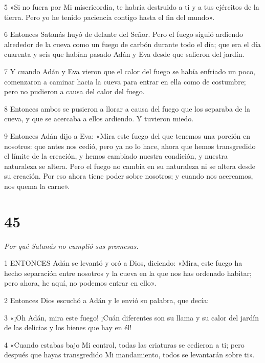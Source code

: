 \par 5 »Si no fuera por Mi misericordia, te habría destruido a ti y a tus ejércitos de la tierra. Pero yo he tenido paciencia contigo hasta el fin del mundo».

\par 6 Entonces Satanás huyó de delante del Señor. Pero el fuego siguió ardiendo alrededor de la cueva como un fuego de carbón durante todo el día; que era el día cuarenta y seis que habían pasado Adán y Eva desde que salieron del jardín.

\par 7 Y cuando Adán y Eva vieron que el calor del fuego se había enfriado un poco, comenzaron a caminar hacia la cueva para entrar en ella como de costumbre; pero no pudieron a causa del calor del fuego.

\par 8 Entonces ambos se pusieron a llorar a causa del fuego que los separaba de la cueva, y que se acercaba a ellos ardiendo. Y tuvieron miedo.

\par 9 Entonces Adán dijo a Eva: «Mira este fuego del que tenemos una porción en nosotros: que antes nos cedió, pero ya no lo hace, ahora que hemos transgredido el límite de la creación, y hemos cambiado nuestra condición, y nuestra naturaleza se altera. Pero el fuego no cambia en su naturaleza ni se altera desde su creación. Por eso ahora tiene poder sobre nosotros; y cuando nos acercamos, nos quema la carne».

\chapter{45}

\par \textit{Por qué Satanás no cumplió sus promesas.}

\par 1 ENTONCES Adán se levantó y oró a Dios, diciendo: «Mira, este fuego ha hecho separación entre nosotros y la cueva en la que nos has ordenado habitar; pero ahora, he aquí, no podemos entrar en ello».

\par 2 Entonces Dios escuchó a Adán y le envió su palabra, que decía:

\par 3 «¡Oh Adán, mira este fuego! ¡Cuán diferentes son su llama y su calor del jardín de las delicias y los bienes que hay en él!

\par 4 «Cuando estabas bajo Mi control, todas las criaturas se cedieron a ti; pero después que hayas transgredido Mi mandamiento, todos se levantarán sobre ti».

